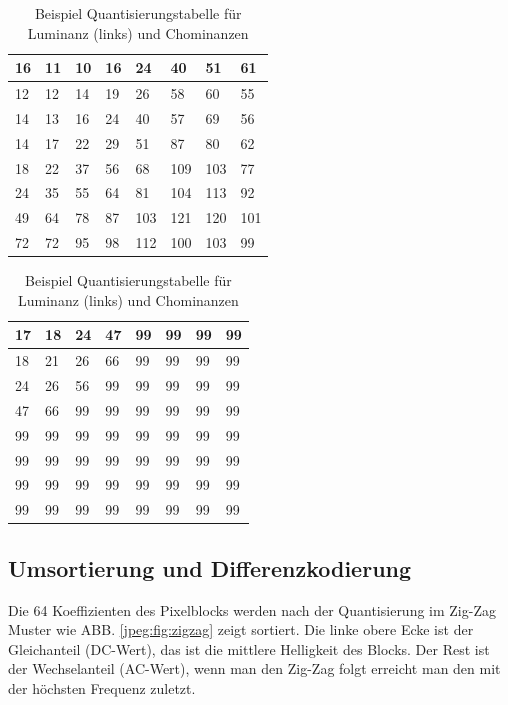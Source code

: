 \begin{table}[b]
    \centering
    \begin{tabularx}{0.47\linewidth}{|X|X|X|X|X|X|X|X|}
        \hline
        16 & 11 & 10 & 16 & 24  & 40 & 51 & 61    \\ \hline
        12 & 12 & 14 & 19 & 26  & 58 & 60 & 55    \\ \hline
        14 & 13 & 16 & 24 & 40  & 57 & 69 & 56    \\ \hline
        14 & 17 & 22 & 29 & 51  & 87 & 80 & 62    \\ \hline
        18 & 22 & 37 & 56 & 68  & 109 & 103 & 77  \\ \hline
        24 & 35 & 55 & 64 & 81  & 104 & 113 & 92  \\ \hline
        49 & 64 & 78 & 87 & 103 & 121 & 120 & 101 \\ \hline
        72 & 72 & 95 & 98 & 112 & 100 & 103 & 99  \\ \hline        
    \end{tabularx}
    \qquad
    \begin{tabularx}{0.47\linewidth}{|X|X|X|X|X|X|X|X|}
        \hline
        17 & 18 & 24 & 47 & 99 & 99 & 99 & 99  \\ \hline
        18 & 21 & 26 & 66 & 99 & 99 & 99 & 99  \\ \hline
        24 & 26 & 56 & 99 & 99 & 99 & 99 & 99  \\ \hline
        47 & 66 & 99 & 99 & 99 & 99 & 99 & 99  \\ \hline
        99 & 99 & 99 & 99 & 99 & 99 & 99 & 99  \\ \hline
        99 & 99 & 99 & 99 & 99 & 99 & 99 & 99  \\ \hline
        99 & 99 & 99 & 99 & 99 & 99 & 99 & 99  \\ \hline
        99 & 99 & 99 & 99 & 99 & 99 & 99 & 99  \\ \hline  	  
    \end{tabularx}
    \caption{Beispiel Quantisierungstabelle für Luminanz (links) und Chominanzen
        \label{jpeg:tab:quant}}
\end{table}



\subsection{Umsortierung und Differenzkodierung
\label{jpeg:subsection:umsortierung}}
Die 64 Koeffizienten des Pixelblocks werden nach der Quantisierung im Zig-Zag Muster wie ABB. \ref{jpeg:fig:zigzag} zeigt sortiert.
Die linke obere Ecke ist der Gleichanteil (DC-Wert), das ist die mittlere Helligkeit des Blocks.
Der Rest ist der Wechselanteil (AC-Wert), wenn man den Zig-Zag folgt erreicht man den mit der höchsten Frequenz zuletzt.

